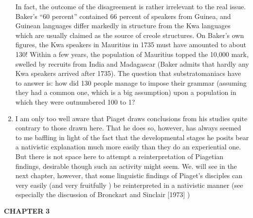 \begin{enumerate}
In fact, the outcome of the disagreement is rather irrelevant to
the real issue. Baker's ``60 percent'' contained 66 percent of speakers from Guinea, and Guinean languages differ markedly in structure from the Kwa languages which are usually claimed as the source of creole structures. On Baker's own figures, the Kwa speakers in Mauritius in 1735 must have amounted to about 130! Within a few years, the population of Mauritius topped the 10,000 mark, swelled by recruits from India and Madagascar (Baker admits that hardly any Kwa speakers arrived after 1735). The question that substratomaniacs have to answer is: how did 130 people manage to impose their grammar (assuming they had a common one, which is a big assumption) upon a population in which they were outnumbered 100 to 1?


\item I am only too well aware that Piaget draws conclusions from
his studies quite contrary to those drawn here. That he does so, how\-ever, has always seemed to me baffling in light of the fact that the developmental stages he posits bear a nativistic explanation much more
easily than they do an experiential one. But there is not space here to attempt a reinterpretation of Piagetian findings, desirable though such an activity might seem. We. will see in the next chapter, however, that some linguistic findings of Piaget's disciples can very easily (and very fruitfully ) be reinterpreted in a nativistic manner (see especially the discussion of Bronckart and Sinclair [1973] ) 

\end{enumerate}
\textbf{CHAPTER} \textbf{3}


